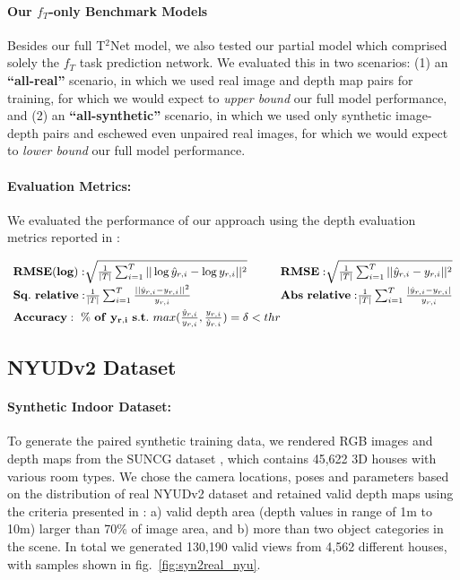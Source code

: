 \documentclass[runningheads]{llncs}
\begin{document}
\paragraph{\bf Our $f_T$-only Benchmark Models} Besides our full T$^2$Net model, we also tested our partial model which comprised solely the $f_T$ task prediction network. We evaluated this in two scenarios: (1) an \textbf{``all-real''} scenario, in which we used real image and depth map pairs for training, for which we would expect to \emph{upper bound} our full model performance, and (2) an \textbf{``all-synthetic''} scenario, in which we used only synthetic image-depth pairs and eschewed even unpaired real images, for which we would expect to \emph{lower bound} our full model performance.

\paragraph{\bf Evaluation Metrics:} We evaluated the performance of our approach using the depth evaluation metrics reported in \cite{eigen2014depth}:

\begin{equation*}
\small
\renewcommand{\arraystretch}{1.6}
\setlength{\arraycolsep}{0pt}
\begin{array}{ll}
{\bf RMSE(log):} \sqrt{\frac{1}{|T|}\sum_{i=1}^{T}||\log \hat{y}_{r,i} - \log y_{r,i} ||^2} & {\bf RMSE:} \sqrt{\frac{1}{|T|}\sum_{i=1}^{T}||\hat{y}_{r,i} - y_{r,i}||^2}\\
{\bf Sq.\ relative:} \frac{1}{|T|}\sum_{i=1}^{T}\frac{||\hat{y}_{r,i} - y_{r,i}||^2}{y_{r,i}} & {\bf Abs\ relative:} \frac{1}{|T|}\sum_{i=1}^{T}\frac{|\hat{y}_{r,i} - y_{r,i}|}{y_{r,i}} \\
{\bf Accuracy:\ \% \ of\ y_{r,i}\ s.t.}\ max(\frac{\hat{y}_{r,i}}{y_{r,i}}, \frac{y_{r,i}}{\hat{y}_{r.i}})=\delta < thr
\end{array}
\end{equation*}

\subsection{NYUDv2 Dataset}

\paragraph{\bf Synthetic Indoor Dataset:} To generate the paired synthetic training data, we rendered RGB images and depth maps from the SUNCG dataset \cite{song2017semantic}, which contains 45,622 3D houses with various room types. We chose the camera locations, poses and parameters based on the distribution of real NYUDv2 dataset \cite{silberman2012indoor} and retained valid depth maps using the criteria presented in \cite{song2017semantic}: a) valid depth area (depth values in range of 1m to 10m) larger than 70\% of image area, and b) more than two object categories in the scene. In total we generated 130,190 valid views from 4,562 different houses, with samples shown in fig.~\ref{fig:syn2real_nyu}. 
\end{document}
